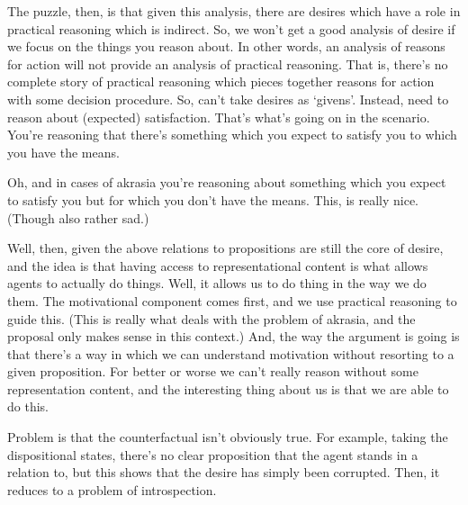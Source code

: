 \documentclass[10pt]{article}
\begin{document}
{\color{blue}
  The puzzle, then, is that given this analysis, there are desires which have a role in practical reasoning which is indirect.
  So, we won't get a good analysis of desire if we focus on the things you reason about.
  In other words, an analysis of reasons for action will not provide an analysis of practical reasoning.
  That is, there's no complete story of practical reasoning which pieces together reasons for action with some decision procedure.
  So, can't take desires as `givens'.
  Instead, need to reason about (expected) satisfaction.
  That's what's going on in the scenario.
  You're reasoning that there's something which you expect to satisfy you to which you have the means.
}

{\color{green}
  Oh, and in cases of akrasia you're reasoning about something which you expect to satisfy you but for which you don't have the means.
  This, is really nice.
  (Though also rather sad.)
}

{\color{blue}
  Well, then, given the above relations to propositions are still the core of desire, and the idea is that having access to representational content is what allows agents to actually do things.
  Well, it allows us to do thing in the way we do them.
  The motivational component comes first, and we use practical reasoning to guide this.
  (This is really what deals with the problem of akrasia, and the proposal only makes sense in this context.)
  And, the way the argument is going is that there's a way in which we can understand motivation without resorting to a given proposition.
  For better or worse we can't really reason without some representation content, and the interesting thing about us is that we are able to do this.
  
}




{\color{red} Problem is that the counterfactual isn't obviously true.
  For example, taking the dispositional states, there's no clear proposition that the agent stands in a relation to, but this shows that the desire has simply been corrupted.
  Then, it reduces to a problem of introspection.}
\end{document}
